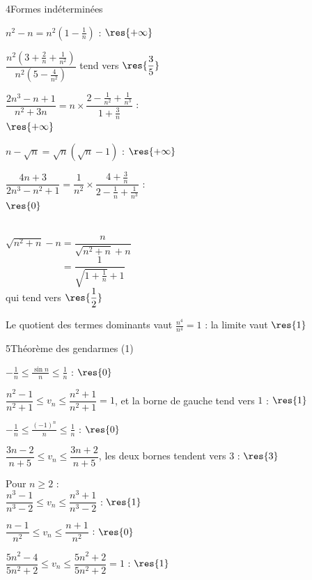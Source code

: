 \begin{deuxcolonnes}
\begin{corrige}{4}{Formes indéterminées}
\begin{questions}
  \item $n^{2}-n=n^{2}\left(1-\frac{1}{n}\right)$ : $\res{+\infty}$
  \item $\dfrac{n^{2}\left(3+\frac{2}{n}+\frac{1}{n^{2}}\right)}{n^{2}\left(5-\frac{4}{n^{2}}\right)}$ tend vers $\res{\dfrac{3}{5}}$
  \item $\dfrac{2n^{3}-n+1}{n^{2}+3n}=n\times\dfrac{2-\frac{1}{n^{2}}+\frac{1}{n^{3}}}{1+\frac{3}{n}}$ :\\ $\res{+\infty}$
  \item $n-\sqrt{n}=\sqrt{n}\left(\sqrt{n}-1\right)$ : $\res{+\infty}$
  \item $\dfrac{4n+3}{2n^{3}-n^{2}+1}=\dfrac{1}{n^{2}}\times\dfrac{4+\frac{3}{n}}{2-\frac{1}{n}+\frac{1}{n^{3}}}$ :\\ $\res{0}$
  \item {}\\
    $\sqrt{n^{2}+n}-n=\dfrac{n}{\sqrt{n^{2}+n}+n}$\\
    $\phantom{\sqrt{n^{2}+n}-n}=\dfrac{1}{\sqrt{1+\frac{1}{n}}+1}$\\
    qui tend vers $\res{\dfrac{1}{2}}$
  \item Le quotient des termes dominants vaut $\frac{n^{4}}{n^{4}}=1$ : la limite vaut $\res{1}$
\end{questions}
\end{corrige}

\begin{corrige}{5}{Théorème des gendarmes (1)}
\begin{questions}
  \item $-\frac{1}{n}\leq\frac{\sin n}{n}\leq\frac{1}{n}$ : $\res{0}$
  \item $\dfrac{n^{2}-1}{n^{2}+1}\leq v_n\leq\dfrac{n^{2}+1}{n^{2}+1}=1$, et la borne de gauche tend vers $1$ : $\res{1}$
  \item $-\frac{1}{n}\leq\frac{(-1)^{n}}{n}\leq\frac{1}{n}$ : $\res{0}$
  \item $\dfrac{3n-2}{n+5}\leq v_n\leq\dfrac{3n+2}{n+5}$, les deux bornes tendent vers $3$ : $\res{3}$
  \item Pour $n\geq2$ :\\ $\dfrac{n^{3}-1}{n^{3}-2}\leq v_n\leq\dfrac{n^{3}+1}{n^{3}-2}$ : $\res{1}$
  \item $\dfrac{n-1}{n^{2}}\leq v_n\leq\dfrac{n+1}{n^{2}}$ : $\res{0}$
  \item $\dfrac{5n^{2}-4}{5n^{2}+2}\leq v_n\leq\dfrac{5n^{2}+2}{5n^{2}+2}=1$ : $\res{1}$
\end{questions}
\end{corrige}


\end{deuxcolonnes}

